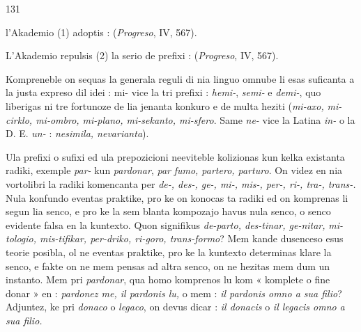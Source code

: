 \begin{VUpage}[135]{131}

\VUcontinue
{} l'Akademio (1) adoptis : \nl
{} (\textit{Progreso}, IV, 567).

L'Akademio repulsis (2) la serio de prefixi : \nl
{} (\textit{Progreso}, IV, 567).

Kompreneble on sequas la generala reguli di nia linguo\nl
omnube li esas suficanta a la justa expreso dil idei : mi-\nl
vice la tri prefixi : \textit{hemi-}, \textit{semi-} e \textit{demi-}, quo liberigas ni tre\nl
fortunoze de lia jenanta konkuro e de multa heziti (\textit{mi-axo,}\nl
\textit{mi-cirklo, mi-ombro, mi-plano, mi-sekanto, mi-sfero}. Same\nl
\textit{ne-} vice la Latina \textit{in-} o la D. E. \textit{un-} : \textit{nesimila, nevarianta}).\parplein

\VUsaut{7.74mm}
\VUsaut{4.45mm}

Ula prefixi o sufixi ed ula prepozicioni neeviteble kolizionas\nl
kun kelka existanta radiki, exemple \textit{par-} kun \textit{pardonar}, \textit{par}\cc
\textit{fumo, partero, parturo}. On videz en nia vortolibri la radiki\nl
komencanta per \textit{de-, des-, ge-, mi-, mis-, per-, ri-, tra-, trans-.}\nl
Nula konfundo eventas praktike, pro ke on konocas ta\nl
radiki ed on komprenas li segun lia senco, e pro ke la sem\cc
blanta kompozajo havus nula senco, o senco evidente falsa\nl
en la kuntexto. Quon signifikus \textit{de-parto, des-tinar, ge-nitar,}\nl
\textit{mi-tologio, mis-tifikar, per-driko, ri-goro, trans-formo}? Mem\nl
kande dusenceso esus teorie posibla, ol ne eventas praktike,\nl
pro ke la kuntexto determinas klare la senco, e fakte on ne\nl
mem pensas ad altra senco, on ne hezitas mem dum un\nl
instanto. Mem pri \textit{pardonar}, qua homo komprenos lu kom\nl
« komplete o fine donar » en : \textit{pardonez me, il pardonis lu,}\nl
o mem : \textit{il pardonis omno a sua filio}? Adjuntez, ke pri\nl
\textit{donaco} o \textit{legaco}, on devus dicar : \textit{il donacis} o \textit{il legacis omno}\nl
\textit{a sua filio.}
\end{VUpage}

